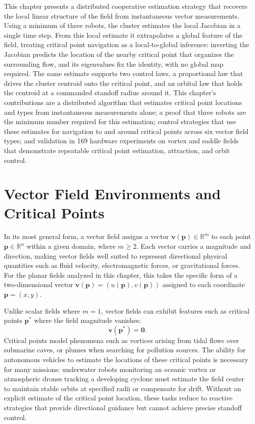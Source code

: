 \documentclass[12pt, letterpaper, oneside]{report}
\begin{document}
This chapter presents a distributed cooperative estimation strategy that
recovers the local linear structure of the field from instantaneous vector
measurements. Using a minimum of three robots, the cluster estimates the
local Jacobian in a single time step. From this local estimate it
extrapolates a global feature of the field, treating critical point
navigation as a local-to-global inference: inverting the Jacobian predicts
the location of the nearby critical point that organizes the surrounding
flow, and its eigenvalues fix the identity, with no global map required. The
same estimate supports two control laws, a proportional law that drives the
cluster centroid onto the critical point, and an orbital law that holds the
centroid at a commanded standoff radius around it. This chapter's
contributions are a distributed algorithm that estimates critical point
locations and types from instantaneous measurements alone; a proof that
three robots are the minimum number required for this estimation; control
strategies that use these estimates for navigation to and around critical
points across six vector field types; and validation in 169 hardware
experiments on vortex and saddle fields that demonstrate repeatable critical
point estimation, attraction, and orbit control.

\section{Vector Field Environments and Critical Points}

In its most general form, a vector field assigns a vector
$\mathbf{v}(\mathbf{p}) \in \mathbb{R}^m$ to each point
$\mathbf{p}\in\mathbb{R}^n$ within a given domain, where $m\geq2$. Each
vector carries a magnitude and direction, making vector fields well suited
to represent directional physical quantities such as fluid velocity,
electromagnetic forces, or gravitational forces. For the planar fields
analyzed in this chapter, this takes the specific form of a two-dimensional
vector $\mathbf{v}(\mathbf{p}) = (u(\mathbf{p}),v(\mathbf{p}))$ assigned to
each coordinate $\mathbf{p}=(x,y)$.

Unlike scalar fields where $m=1$, vector fields can exhibit features such as
critical points $\mathbf{p}^*$ where the field magnitude vanishes:
\begin{equation}
\mathbf{v}(\mathbf{p}^*) = \mathbf{0}.
\end{equation}
Critical points model phenomena such as vortices arising from tidal flows
over submarine caves, or plumes when searching for pollution sources. The
ability for autonomous vehicles to estimate the locations of these critical
points is necessary for many missions: underwater robots monitoring an
oceanic vortex or atmospheric drones tracking a developing cyclone must
estimate the field center to maintain stable orbits at specified radii or
compensate for drift. Without an explicit estimate of the critical point
location, these tasks reduce to reactive strategies that provide directional
guidance but cannot achieve precise standoff control.
\end{document}

